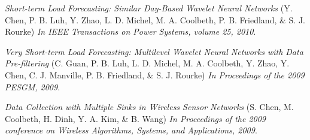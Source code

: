 \documentclass[11pt,a4paper,sans]{moderncv} %
\begin{document}
\begin{thebibliography}{1}

	 {\em Short-term Load Forecasting: Similar Day-Based Wavelet Neural Networks}
		(Y. Chen, P. B. Luh, Y. Zhao, L. D. Michel, M. A. Coolbeth, P. B. Friedland, \& S. J. Rourke)
		{\em In IEEE Transactions on Power Systems, volume 25, 2010}.

	 {\em Very Short-term Load Forecasting: Multilevel Wavelet Neural Networks with Data
		Pre-filtering}
		(C. Guan, P. B. Luh, L. D. Michel, M. A. Coolbeth, Y. Zhao, Y. Chen, C. J. Manville, P. B. Friedland,
		\& S. J. Rourke)
		{\em In Proceedings of the 2009 PESGM, 2009}.

	 {\em Data Collection with Multiple Sinks in Wireless Sensor Networks} 
		(S. Chen, M. Coolbeth, H. Dinh, Y. A. Kim, \& B. Wang)
		{\em In Proceedings of the 2009 conference on Wireless Algorithms, Systems, and Applications, 2009}.

\end{thebibliography}
\end{document}
